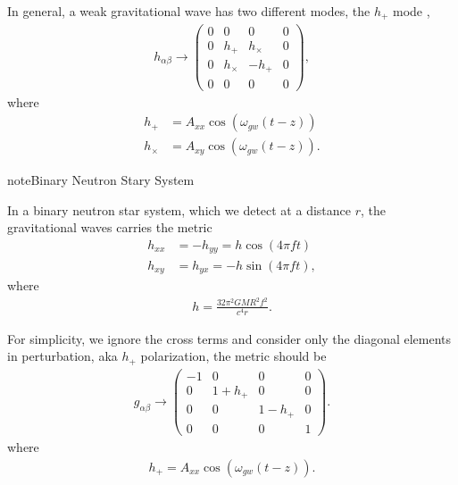 \documentclass[letterpaper,12pt,english]{sphinxmanual}
\begin{document}
In general, a weak gravitational wave has two different modes, the \(h_+\) mode \label{\detokenize{gravity/gravitational-waves:id1}}{\hyperref[\detokenize{gravity/gravitational-waves:schutz}]{\sphinxcrossref{{[}Schutz{]}}}},
\begin{equation*}
\begin{split}h_{\alpha\beta} \to \begin{pmatrix}
0 & 0 & 0 & 0 \\
0 & h_+ & h_\times & 0 \\
0 & h_\times & -h_+ & 0 \\
0 & 0 & 0 & 0
\end{pmatrix},\end{split}
\end{equation*}
where
\begin{equation*}
\begin{split}h_+ &= A_{xx} \cos(\omega_{gw}(t-z))\\
h_\times &= A_{xy} \cos(\omega_{gw}(t-z)).\end{split}
\end{equation*}
\begin{sphinxadmonition}{note}{Binary Neutron Stary System}

In a binary neutron star system, which we detect at a distance \(r\), the gravitational waves carries the metric \label{\detokenize{gravity/gravitational-waves:id2}}{\hyperref[\detokenize{gravity/gravitational-waves:hendry2007}]{\sphinxcrossref{{[}Hendry2007{]}}}}
\begin{equation*}
\begin{split}h_{xx} &= -h_{yy} =h\cos(4\pi f t)\\
h_{xy}&=h_{yx} = - h\sin (4\pi f t),\end{split}
\end{equation*}
where
\begin{equation*}
\begin{split}h = \frac{ 32\pi^2 G M R^2 f^2 }{c^4 r}.\end{split}
\end{equation*}\end{sphinxadmonition}

For simplicity, we ignore the cross terms and consider only the diagonal elements in perturbation, aka \(h_+\) polarization, the metric should be
\begin{equation*}
\begin{split}g_{\alpha\beta}\to \begin{pmatrix}
-1 & 0 & 0 & 0 \\
0 & 1 + h_+ & 0 & 0 \\
0 & 0 & 1-h_+ & 0 \\
0 & 0 & 0 & 1
\end{pmatrix}.\end{split}
\end{equation*}
where
\begin{equation*}
\begin{split}h_+ = A_{xx} \cos(\omega_{gw}(t-z)).\end{split}
\end{equation*}
\end{document}
